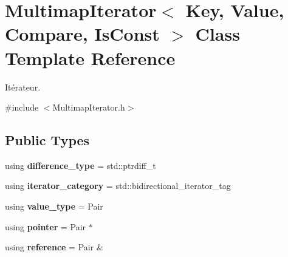 \hypertarget{classMultimapIterator}{}\section{Multimap\+Iterator$<$ Key, Value, Compare, Is\+Const $>$ Class Template Reference}
\label{classMultimapIterator}


Itérateur.  




{\ttfamily \#include $<$Multimap\+Iterator.\+h$>$}

\subsection*{Public Types}
\begin{DoxyCompactItemize}
\item 
\mbox{\label{classMultimapIterator_a899266d0ec292bcb0cc369e5ee421434}} 
using {\bfseries difference\+\_\+type} = std\+::ptrdiff\+\_\+t
\item 
\mbox{\label{classMultimapIterator_a3cdb3b8fcf5c7148a895559ed69f353f}} 
using {\bfseries iterator\+\_\+category} = std\+::bidirectional\+\_\+iterator\+\_\+tag
\item 
\mbox{\label{classMultimapIterator_a9c0233078690a6541aea151e6df0b3d7}} 
using {\bfseries value\+\_\+type} = Pair
\item 
\mbox{\label{classMultimapIterator_aaafa1d93e40c7a18504a95661938515f}} 
using {\bfseries pointer} = Pair $\ast$
\item 
\mbox{\label{classMultimapIterator_a4c5da38f2cdfa8a27f7db2da46cfa2fa}} 
using {\bfseries reference} = Pair \&
\end{DoxyCompactItemize}
